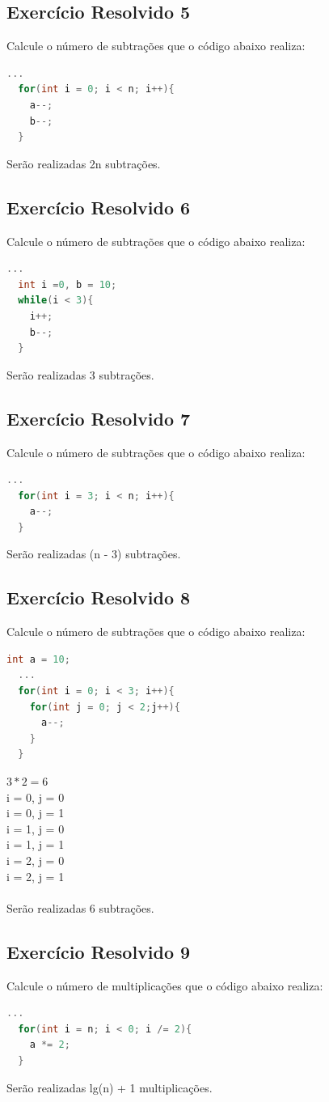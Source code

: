 \documentclass[12pt]{article}
\begin{document}
\subsection{Exercício Resolvido 5}
Calcule o número de subtrações que o código abaixo realiza:
\begin{lstlisting}[language=C]
  ...
  for(int i = 0; i < n; i++){
    a--;
    b--;
  }
\end{lstlisting}
Serão realizadas 2n subtrações.

\subsection{Exercício Resolvido 6}
Calcule o número de subtrações que o código abaixo realiza:
\begin{lstlisting}[language=C]
  ...
  int i =0, b = 10;
  while(i < 3){
    i++;
    b--;
  }
\end{lstlisting}
Serão realizadas 3 subtrações.

\subsection{Exercício Resolvido 7}
Calcule o número de subtrações que o código abaixo realiza:
\begin{lstlisting}[language=C]
  ...
  for(int i = 3; i < n; i++){
    a--;
  }
\end{lstlisting}
Serão realizadas (n - 3) subtrações.

\subsection{Exercício Resolvido 8}
Calcule o número de subtrações que o código abaixo realiza:
\begin{lstlisting}[language=C]
  int a = 10;
  ...
  for(int i = 0; i < 3; i++){
    for(int j = 0; j < 2;j++){
      a--;
    }
  }
\end{lstlisting}
$3 * 2 = 6$\\
i = 0, j = 0\\
i = 0, j = 1\\
i = 1, j = 0\\
i = 1, j = 1\\
i = 2, j = 0\\
i = 2, j = 1\\
\\Serão realizadas 6 subtrações.

\subsection{Exercício Resolvido 9}
Calcule o número de multiplicações que o código abaixo realiza:
\begin{lstlisting}[language=C]
  ...
  for(int i = n; i < 0; i /= 2){
    a *= 2;
  }
\end{lstlisting}
Serão realizadas lg(n) + 1 multiplicações.
\end{document}

